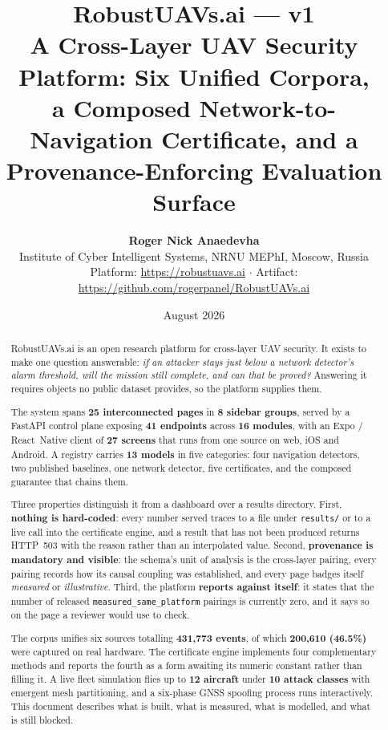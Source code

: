 \documentclass[11pt,a4paper]{article}
\title{%
  \vspace{-1cm}
  {\LARGE\bfseries RobustUAVs.ai --- v1}\\[6pt]
  {\large A Cross-Layer UAV Security Platform: Six Unified Corpora,\\
   a Composed Network-to-Navigation Certificate, and a\\
   Provenance-Enforcing Evaluation Surface}}
\author{%
  \textbf{Roger Nick Anaedevha}\\
  Institute of Cyber Intelligent Systems, NRNU MEPhI, Moscow, Russia\\[8pt]
  \normalsize Platform: \url{https://robustuavs.ai} \quad$\cdot$\quad
  Artifact: \url{https://github.com/rogerpanel/RobustUAVs.ai}}
\date{August 2026}
\newcommand{\code}[1]{\texttt{#1}}
\begin{document}
\maketitle
\thispagestyle{fancy}

\begin{abstract}
\noindent
RobustUAVs.ai is an open research platform for cross-layer UAV security. It
exists to make one question answerable: \emph{if an attacker stays just below a
network detector's alarm threshold, will the mission still complete, and can
that be proved?} Answering it requires objects no public dataset provides, so
the platform supplies them.

The system spans \textbf{25 interconnected pages} in \textbf{8 sidebar groups},
served by a FastAPI control plane exposing \textbf{41 endpoints} across
\textbf{16 modules}, with an Expo / React~Native client of \textbf{27 screens}
that runs from one source on web, iOS and Android. A registry carries
\textbf{13 models} in five categories: four navigation detectors, two published
baselines, one network detector, five certificates, and the composed guarantee
that chains them.

Three properties distinguish it from a dashboard over a results directory.
First, \textbf{nothing is hard-coded}: every number served traces to a file
under \code{results/} or to a live call into the certificate engine, and a
result that has not been produced returns HTTP~503 with the reason rather than
an interpolated value. Second, \textbf{provenance is mandatory and visible}: the
schema's unit of analysis is the cross-layer pairing, every pairing records how
its causal coupling was established, and every page badges itself
\emph{measured} or \emph{illustrative}. Third, the platform \textbf{reports
against itself}: it states that the number of released
\code{measured\_same\_platform} pairings is currently zero, and it says so on
the page a reviewer would use to check.

The corpus unifies six sources totalling \textbf{431,773 events}, of which
\textbf{200,610 (46.5\%)} were captured on real hardware. The certificate engine
implements four complementary methods and reports the fourth as a form awaiting
its numeric constant rather than filling it. A live fleet simulation flies up to
\textbf{12 aircraft} under \textbf{10 attack classes} with emergent mesh
partitioning, and a six-phase GNSS spoofing process runs interactively. This
document describes what is built, what is measured, what is modelled, and what
is still blocked.
\end{abstract}
\end{document}
